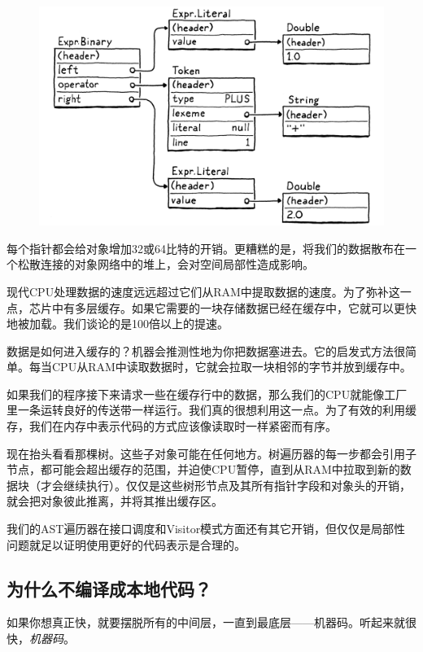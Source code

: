 \documentclass[cn,11pt,chinese]{elegantbook}
\begin{document}
\begin{figure}[htbp]
  \centering
  \includegraphics[width=\textwidth]{image/chunks-of-bytecode/ast.png}
\end{figure}

每个指针都会给对象增加32或64比特的开销。更糟糕的是，将我们的数据散布在一个松散连接的对象网络中的堆上，会对空间局部性造成影响。

现代CPU处理数据的速度远远超过它们从RAM中提取数据的速度。为了弥补这一点，芯片中有多层缓存。如果它需要的一块存储数据已经在缓存中，它就可以更快地被加载。我们谈论的是100倍以上的提速。

数据是如何进入缓存的？机器会推测性地为你把数据塞进去。它的启发式方法很简单。每当CPU从RAM中读取数据时，它就会拉取一块相邻的字节并放到缓存中。

如果我们的程序接下来请求一些在缓存行中的数据，那么我们的CPU就能像工厂里一条运转良好的传送带一样运行。我们真的很想利用这一点。为了有效的利用缓存，我们在内存中表示代码的方式应该像读取时一样紧密而有序。

现在抬头看看那棵树。这些子对象可能在任何地方。树遍历器的每一步都会引用子节点，都可能会超出缓存的范围，并迫使CPU暂停，直到从RAM中拉取到新的数据块（才会继续执行）。仅仅是这些树形节点及其所有指针字段和对象头的开销，就会把对象彼此推离，并将其推出缓存区。

我们的AST遍历器在接口调度和Visitor模式方面还有其它开销，但仅仅是局部性问题就足以证明使用更好的代码表示是合理的。

\subsection{为什么不编译成本地代码？}

如果你想真正快，就要摆脱所有的中间层，一直到最底层——机器码。听起来就很快，\textit{机器码}。
\end{document}

